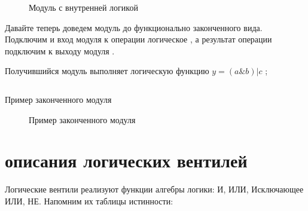 \begin{figure}[H]
  \centering
  \def\svgwidth{9cm}
  
  \caption{Модуль с внутренней логикой}
\end{figure}

Давайте теперь доведем модуль до функционально законченного вида. Подключим  и вход модуля  к операции логическое , а результат операции подключим к выходу модуля .

Получившийся модуль выполняет логическую функцию $y = (a \& b) | c $ ;

\begin{listing}[H]
	\inputminted{SystemVerilog}{code_examples/lab_1/module_example_5.sv}
	\caption{Пример законченного модуля}
\end{listing}



\begin{figure}[H]
  \centering
  \def\svgwidth{9cm}
  
  \caption{Пример законченного модуля}
\end{figure}





\section{ описания логических вентилей}

\par{Логические вентили реализуют функции алгебры логики: И, ИЛИ, Исключающее ИЛИ, НЕ. Напомним их таблицы истинности:}

